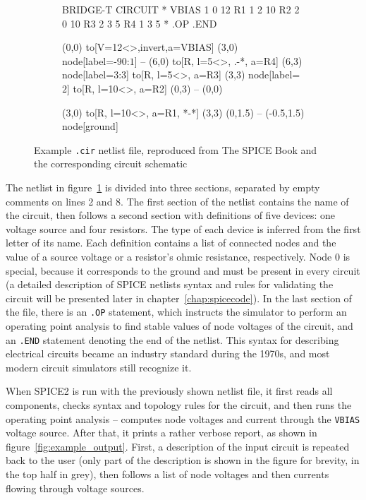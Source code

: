 \begin{figure}[h]
\centering
\begin{subfigure}{.25\textwidth}
\begin{spicecode}
BRIDGE-T CIRCUIT
*
VBIAS 1 0 12
R1 1 2 10
R2 2 0 10
R3 2 3 5
R4 1 3 5
*
.OP
.END
\end{spicecode}		
	\end{subfigure}\hspace{5mm}
	\begin{subfigure}{.7\textwidth}	
	\centering	
		\begin{circuitdev}
			(0,0) 
			to[V=12<\volt>,invert,a=VBIAS] (3,0) node[label={-90:$1$}]{}
			-- (6,0)
			to[R, l=5<\ohm>, .-*, a=R4] (6,3) node[label={3:$3$}]{}
			to[R, l=5<\ohm>, a=R3] (3,3) node[label={$2$}]{}
			to[R, l=10<\ohm>, a=R2] (0,3)
			-- (0,0)
		
			(3,0) to[R, l=10<\ohm>, a=R1, *-*] (3,3)
			(0,1.5) -- (-0.5,1.5) node[ground]{}
		\end{circuitdev}
\end{subfigure}
	\caption{Example \texttt{.cir} netlist file, reproduced from The SPICE Book \cite{spice_book} and the corresponding circuit schematic}
	\label{fig:example_circuit}
\end{figure}

The netlist in figure~\ref{fig:example_circuit} is divided into three sections, separated by empty comments on lines 2 and 8. The first section of the netlist contains the name of the circuit, then follows a second section with definitions of five devices: one voltage source and four resistors. The type of each device is inferred from the first letter of its name. Each definition contains a list of connected nodes and the value of a source voltage or a resistor's ohmic resistance, respectively. Node 0 is special, because it corresponds to the ground and must be present in every circuit (a detailed description of SPICE netlists syntax and rules for validating the circuit will be presented later in chapter~\ref{chap:spicecode}). In the last section of the file, there is an \texttt{.OP} statement, which instructs the simulator to perform an operating point analysis to find stable values of node voltages of the circuit, and an \texttt{.END} statement denoting the end of the netlist. This syntax for describing electrical circuits became an industry standard during the 1970s, and most modern circuit simulators still recognize it.

When SPICE2 is run with the previously shown netlist file, it first reads all components, checks syntax and topology rules for the circuit, and then runs the operating point analysis -- computes node voltages and current through the \texttt{VBIAS} voltage source. After that, it prints a rather verbose report, as shown in figure~\ref{fig:example_output}. First, a description of the input circuit is repeated back to the user (only part of the description is shown in the figure for brevity, in the top half in grey), then follows a list of node voltages and then currents flowing through voltage sources.

